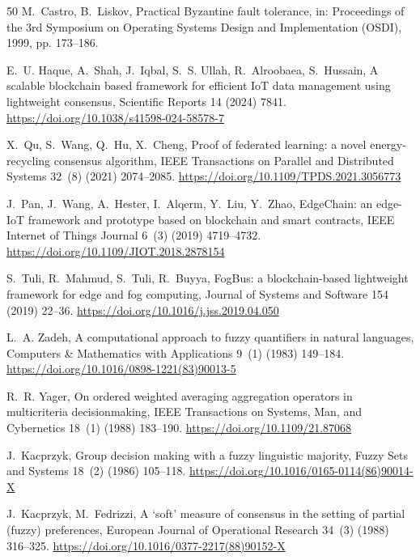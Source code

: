 \documentclass[preprint,11pt]{elsarticle}
\begin{document}
\begin{thebibliography}{50}
M.~Castro, B.~Liskov, Practical Byzantine fault tolerance, in:
Proceedings of the 3rd Symposium on Operating Systems Design and
Implementation (OSDI), 1999, pp. 173--186.

E.~U. Haque, A.~Shah, J.~Iqbal, S.~S. Ullah, R.~Alroobaea, S.~Hussain,
A scalable blockchain based framework for efficient IoT data management
using lightweight consensus, Scientific Reports 14 (2024) 7841.
\url{https://doi.org/10.1038/s41598-024-58578-7}

X.~Qu, S.~Wang, Q.~Hu, X.~Cheng, Proof of federated learning: a novel
energy-recycling consensus algorithm, IEEE Transactions on Parallel and
Distributed Systems 32~(8) (2021) 2074--2085.
\url{https://doi.org/10.1109/TPDS.2021.3056773}

J.~Pan, J.~Wang, A.~Hester, I.~Alqerm, Y.~Liu, Y.~Zhao, EdgeChain: an
edge-IoT framework and prototype based on blockchain and smart
contracts, IEEE Internet of Things Journal 6~(3) (2019) 4719--4732.
\url{https://doi.org/10.1109/JIOT.2018.2878154}

S.~Tuli, R.~Mahmud, S.~Tuli, R.~Buyya, FogBus: a blockchain-based
lightweight framework for edge and fog computing, Journal of Systems
and Software 154 (2019) 22--36.
\url{https://doi.org/10.1016/j.jss.2019.04.050}


L.~A. Zadeh, A computational approach to fuzzy quantifiers in natural
languages, Computers \& Mathematics with Applications 9~(1) (1983)
149--184.
\url{https://doi.org/10.1016/0898-1221(83)90013-5}

R.~R. Yager, On ordered weighted averaging aggregation operators in
multicriteria decisionmaking, IEEE Transactions on Systems, Man, and
Cybernetics 18~(1) (1988) 183--190.
\url{https://doi.org/10.1109/21.87068}

J.~Kacprzyk, Group decision making with a fuzzy linguistic majority,
Fuzzy Sets and Systems 18~(2) (1986) 105--118.
\url{https://doi.org/10.1016/0165-0114(86)90014-X}

J.~Kacprzyk, M.~Fedrizzi, A `soft' measure of consensus in the setting
of partial (fuzzy) preferences, European Journal of Operational
Research 34~(3) (1988) 316--325.
\url{https://doi.org/10.1016/0377-2217(88)90152-X}


\end{thebibliography}
\end{document}

